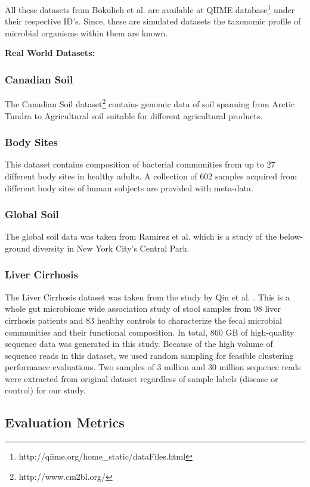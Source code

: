 \documentclass[10pt, conference, compsocconf]{IEEEtran}
\begin{document}
All these datasets from Bokulich et al. \cite{MARmockDatasetRef} are available at QIIME database\footnote{http://qiime.org/home\_static/dataFiles.html} under their respective ID's. Since, these are simulated datasets the taxonomic profile of microbial organisms within them are known.

\textbf{Real World Datasets:}

\subsubsection{Canadian Soil}
The Canadian Soil dataset\footnote{http://www.cm2bl.org/} contains genomic data of soil spanning from Arctic Tundra to Agricultural soil suitable for different agricultural products.  

\subsubsection{Body Sites}
This dataset contains composition of bacterial communities from up to 27 different body sites in healthy adults. A collection of 602 samples acquired from different body sites of human subjects are provided with meta-data.

\subsubsection{Global Soil}
The global soil data was taken from Ramirez et al. \cite{MARglobalSoil} which is a study of the below-ground diversity in New York City's Central Park.

\subsubsection{Liver Cirrhosis}
The Liver Cirrhosis dataset was taken from the study by Qin et al. \cite{qin2014alterations}. This is 
a whole gut microbiome wide association study of stool samples from 98 liver cirrhosis patients and 83 
healthy controls to characterize the fecal microbial communities and their functional composition. In total, 
860 GB of high-quality sequence data was 
generated in this study. Because of the high volume of sequence reads in this dataset, we used random sampling for 
feasible clustering performance evaluations. Two samples of 3 million and 30 million sequence reads were extracted 
from original dataset regardless of sample labels 
(disease or control) for our study.  


\subsection{\textbf{Evaluation Metrics}}
\end{document}
